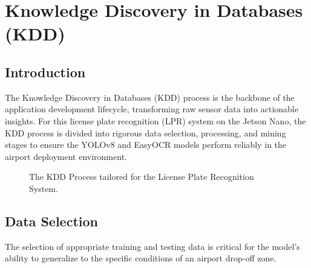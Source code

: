 %
%
%

\usetikzlibrary{shapes, arrows, positioning, fit}

\chapter{Knowledge Discovery in Databases (KDD)}
\label{ch:application_development}

\section{Introduction}
\label{sec:kdd}

The Knowledge Discovery in Databases (KDD) process is the backbone of the application development lifecycle, transforming raw sensor data into actionable insights. For this license plate recognition (LPR) system on the Jetson Nano, the KDD process is divided into rigorous data selection, processing, and mining stages to ensure the YOLOv8 and EasyOCR models perform reliably in the airport deployment environment.

\begin{figure}[htbp]
	\centering
	
	\caption{The KDD Process tailored for the License Plate Recognition System.}
	\label{fig:kdd_process}
\end{figure}

\section{Data Selection}
\label{subsec:data_selection}

The selection of appropriate training and testing data is critical for the model's ability to generalize to the specific conditions of an airport drop-off zone.

